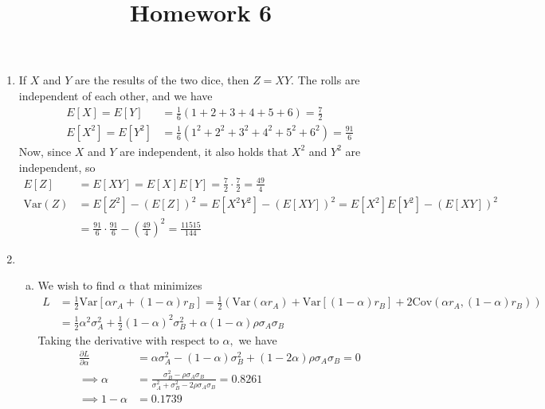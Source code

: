 \documentclass{article}
\newcommand{\var}{\mathrm{Var}}
\newcommand{\cov}{\mathrm{Cov}}
\begin{document}
\title{Homework 6}
\maketitle
\thispagestyle{fancy}

\begin{enumerate}
	\item 
		\begin{soln}
			If $X$ and $Y$ are the results of the two dice, then $Z=XY.$ The rolls are independent of each other, and we have
			\begin{align*}
				E[X] = E[Y] &= \frac{1}{6}(1+2+3+4+5+6) = \frac{7}{2} \\
				E[X^2] = E[Y^2] &= \frac{1}{6}(1^2+2^2+3^2+4^2+5^2+6^2) = \frac{91}{6}
			\end{align*}
			Now, since $X$ and $Y$ are independent, it also holds that $X^2$ and $Y^2$ are independent, so
			\begin{align*}
				E[Z] &= E[XY] = E[X]E[Y] = \frac{7}{2}\cdot \frac{7}{2} = \frac{49}{4} \\
				\var(Z) &= E[Z^2] - (E[Z])^2 = E[X^2Y^2] - (E[XY])^2 = E[X^2]E[Y^2]-(E[XY])^2 \\
				&= \frac{91}{6}\cdot \frac{91}{6} - \left( \frac{49}{4} \right)^2 = \frac{11515}{144}
			\end{align*}
		\end{soln}

	\item 
		\begin{enumerate}[(a)]
			\item 
				\begin{soln}
					We wish to find $\alpha$ that minimizes 
					\begin{align*}
						L &= \frac{1}{2}\var[\alpha r_A + (1-\alpha) r_B] = \frac{1}{2}\left(\var(\alpha r_A) + \var[(1-\alpha)r_B] + 2\cov(\alpha r_A, (1-\alpha) r_B)\right) \\
						&= \frac{1}{2}\alpha^2 \sigma_A^2 + \frac{1}{2}(1-\alpha)^2\sigma_B^2 + \alpha(1-\alpha) \rho\sigma_A\sigma_B
					\end{align*}
					Taking the derivative with respect to $\alpha,$ we have
					\begin{align*}
						\frac{\partial L}{\partial \alpha} &= \alpha\sigma_A^2 - (1-\alpha)\sigma_B^2 + (1-2\alpha)\rho\sigma_A\sigma_B = 0 \\
						\implies \alpha &= \frac{\sigma_B^2-\rho\sigma_A\sigma_B}{\sigma_A^2+\sigma_B^2-2\rho\sigma_A\sigma_B} = 0.8261 \\
						\implies 1-\alpha &= 0.1739
					\end{align*}	
				\end{soln}


\end{enumerate}
\end{enumerate}
\end{document}

